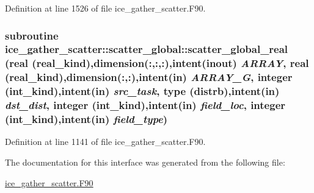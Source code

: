 Definition at line 1526 of file ice\_\-gather\_\-scatter.F90.\hypertarget{interfaceice__gather__scatter_1_1scatter__global_a731bb7bee6c2c6c144477197c6abac73}{
\subsubsection[{scatter\_\-global\_\-real}]{\setlength{\rightskip}{0pt plus 5cm}subroutine ice\_\-gather\_\-scatter::scatter\_\-global::scatter\_\-global\_\-real (real (real\_\-kind),dimension(:,:,:),intent(inout) {\em ARRAY}, \/  real (real\_\-kind),dimension(:,:),intent(in) {\em ARRAY\_\-G}, \/  integer (int\_\-kind),intent(in) {\em src\_\-task}, \/  type ({\bf distrb}),intent(in) {\em dst\_\-dist}, \/  integer (int\_\-kind),intent(in) {\em field\_\-loc}, \/  integer (int\_\-kind),intent(in) {\em field\_\-type})}}
\label{interfaceice__gather__scatter_1_1scatter__global_a731bb7bee6c2c6c144477197c6abac73}


Definition at line 1141 of file ice\_\-gather\_\-scatter.F90.

The documentation for this interface was generated from the following file:\begin{DoxyCompactItemize}
\item 
\hyperlink{ice__gather__scatter_8F90}{ice\_\-gather\_\-scatter.F90}\end{DoxyCompactItemize}
